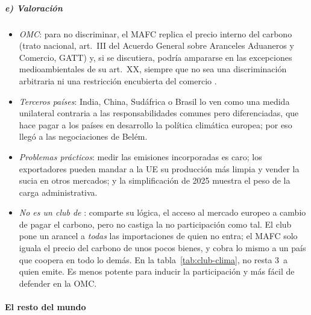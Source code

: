\documentclass[11pt]{article}
\begin{document}
\subparagraph{e) Valoración}

\begin{itemize}
\item \emph{OMC}: para no discriminar, el MAFC replica el precio interno del carbono (trato nacional, art.~III del Acuerdo General sobre Aranceles Aduaneros y Comercio, GATT) y, si se discutiera, podría ampararse en las excepciones medioambientales de su art.~XX, siempre que no sea una discriminación arbitraria ni una restricción encubierta del comercio  .
\item \emph{Terceros países}: India, China, Sudáfrica o Brasil lo ven como una medida unilateral contraria a las responsabilidades comunes pero diferenciadas, que hace pagar a los países en desarrollo la política climática europea; por eso llegó a las negociaciones de Belém.
\item \emph{Problemas prácticos}: medir las emisiones incorporadas es caro; los exportadores pueden mandar a la UE su producción más limpia y vender la sucia en otros mercados; y la simplificación de 2025 muestra el peso de la carga administrativa\nocite{UE2025Reglamento2083}.
\item \emph{No es un club de }: comparte su lógica, el acceso al mercado europeo a cambio de pagar el carbono, pero no castiga la no participación como tal. El club pone un arancel a \emph{todas} las importaciones de quien no entra; el MAFC solo iguala el precio del carbono de unos pocos bienes, y cobra lo mismo a un país que coopera en todo lo demás. En la tabla~\ref{tab:club-clima}, no resta 3~a quien emite. Es menos potente para inducir la participación y más fácil de defender en la OMC.
\end{itemize}

\paragraph{El resto del mundo}
\end{document}
